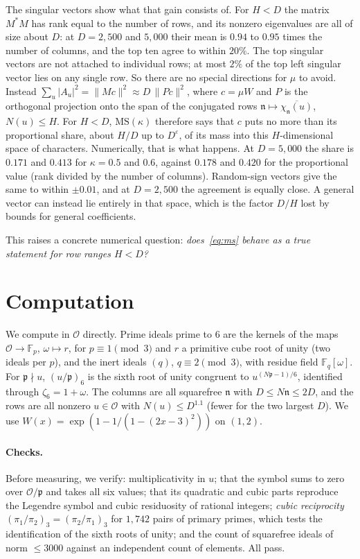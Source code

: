 \documentclass[11pt]{article}
\theoremstyle{remark}
\begin{document}
The singular vectors show what that gain consists of. For $H<D$ the matrix $M^*M$ has rank
equal to the number of rows, and its nonzero eigenvalues are all of size about $D$: at
$D=2{,}500$ and $5{,}000$ their mean is $0.94$ to $0.95$ times the number of columns, and the top
ten agree to within $20\%$. The top singular vectors are not attached to individual rows; at
most $2\%$ of the top left singular vector lies on any single row. So there are no special
directions for $\mu$ to avoid. Instead
$\sum_u|A_u|^2=\|Mc\|^2\approx D\,\|Pc\|^2$, where $c=\mu W$ and $P$ is the orthogonal
projection onto the span of the conjugated rows $\mathfrak n\mapsto\overline{\chi_{\mathfrak n}(u)}$,
$N(u)\le H$. For $H<D$, $\mathrm{MS}(\kappa)$ therefore says that $c$ puts no more than its
proportional share, about $H/D$ up to $D^\varepsilon$, of its mass into this $H$-dimensional space
of characters. Numerically, that is what happens. At $D=5{,}000$ the share is $0.171$ and $0.413$
for $\kappa=0.5$ and $0.6$, against $0.178$ and $0.420$ for the proportional value (rank divided
by the number of columns). Random-sign vectors give the same to within $\pm0.01$, and at
$D=2{,}500$ the agreement is equally close. A general vector can instead lie entirely in that
space, which is the factor $D/H$ lost by bounds for general coefficients.

This raises a concrete numerical question: \emph{does~\eqref{eq:ms} behave as a true
statement for row ranges $H<D$?}

\section{Computation}

We compute in $\mathcal O$ directly. Prime ideals prime to $6$ are the kernels of the maps
$\mathcal O\to\mathbb F_p$, $\omega\mapsto r$, for $p\equiv1\pmod 3$ and $r$ a primitive cube
root of unity (two ideals per $p$), and the inert ideals $(q)$, $q\equiv2\pmod3$, with
residue field $\mathbb F_q[\omega]$. For $\mathfrak p\nmid u$, $(u/\mathfrak p)_6$ is the
sixth root of unity congruent to $u^{(N\mathfrak p-1)/6}$, identified through
$\zeta_6=1+\omega$. The columns are all squarefree $\mathfrak n$ with
$D\le N\mathfrak n\le2D$, and the rows are all nonzero $u\in\mathcal O$ with $N(u)\le D^{1.1}$
(fewer for the two largest $D$). We use $W(x)=\exp(1-1/(1-(2x-3)^2))$ on $(1,2)$.

\paragraph{Checks.} Before measuring, we verify: multiplicativity in $u$; that the symbol
sums to zero over $\mathcal O/\mathfrak p$ and takes all six values; that its quadratic and
cubic parts reproduce the Legendre symbol and cubic residuosity of rational integers;
\emph{cubic reciprocity} $(\pi_1/\pi_2)_3=(\pi_2/\pi_1)_3$ for $1{,}742$ pairs of primary
primes, which tests the identification of the sixth roots of unity; and the count of
squarefree ideals of norm $\le3000$ against an independent count of elements. All pass.
\end{document}
